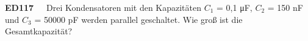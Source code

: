 \documentclass{article}
\begin{document}
\setlength{\parindent}{0pt}

\textbf{ED117}~~~Drei Kondensatoren mit den Kapazitäten $C_1$ = 0,1 μF, $C_2$ = 150 nF und $C_3$ = 50000 pF werden parallel geschaltet. Wie groß ist die Gesamtkapazität?

\vspace*{-2mm}
\end{document}
